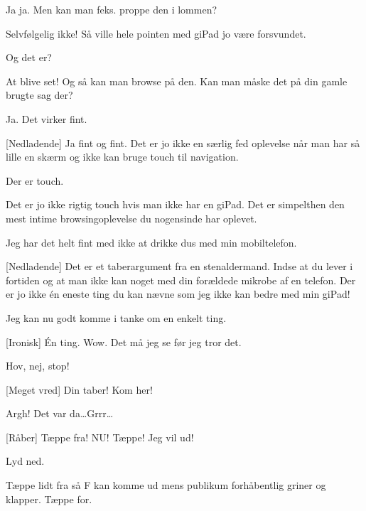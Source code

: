 \documentclass[a4paper,11pt]{article}
\begin{document}
\begin{sketch}
 Ja ja. Men kan man feks. proppe den i lommen? 

 Selvfølgelig ikke! Så ville hele pointen med giPad jo være forsvundet.

 Og det er?

 At blive set! Og så kan man browse på den. Kan man måske det på din gamle brugte sag der?

 Ja. Det virker fint.

[Nedladende] Ja fint og fint. Det er jo ikke en særlig fed oplevelse når man har så lille en skærm og ikke kan bruge touch til navigation.

 Der er touch.

 Det er jo ikke rigtig touch hvis man ikke har en giPad. Det er simpelthen den mest intime browsingoplevelse du nogensinde har oplevet. 

 Jeg har det helt fint med ikke at drikke dus med min mobiltelefon.

[Nedladende] Det er et taberargument fra en stenaldermand. Indse at du lever i fortiden og at man ikke kan noget med din forældede mikrobe af en telefon. Der er jo ikke én eneste ting du kan nævne som jeg ikke kan bedre med min giPad!

 Jeg kan nu godt komme i tanke om en enkelt ting.

[Ironisk] Én ting. Wow. Det må jeg se før jeg tror det.

 

 Hov, nej, stop!

 

[Meget vred] Din taber! Kom her! 

 Argh! Det var da\ldots Grrr\ldots

[Råber] Tæppe fra! NU! Tæppe! Jeg vil ud!

\scene Lyd ned.

\scene Tæppe lidt fra så F kan komme ud mens publikum forhåbentlig griner og klapper.
\scene Tæppe for.

\end{sketch}
\end{document}
